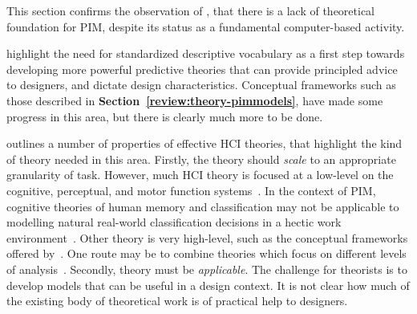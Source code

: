 This section confirms the observation of \citet{Whittaker-rta:00}, that there is a lack of theoretical foundation for PIM, despite its status as a fundamental computer-based activity.  %

\citet{Whittaker-rta:00} highlight the need for standardized descriptive vocabulary as a first step towards developing more powerful predictive theories that can provide principled advice to designers, and dictate design characteristics.  Conceptual frameworks such as those described in \textbf{Section~\ref{review:theory-pimmodels}}, have made some progress in this area, but there is clearly much more to be done.


\citet{rogers:04} outlines a number of properties of effective HCI theories, that highlight the kind of theory needed in this area.   Firstly, the theory should \textit{scale} to an appropriate granularity of task.  However, much HCI theory is focused at a low-level on the cognitive, perceptual, and motor function systems~\citep{newman:95}.  In the context of PIM, cognitive theories of human memory and classification may not be applicable to  modelling natural real-world classification decisions in a hectic work environment~\citep{ml:92}. Other theory is very high-level, such as the conceptual frameworks offered by~\citet{dk:01}.  One route may be to combine theories which focus on different levels of analysis~\citep{barnard:00}.   Secondly, theory must be \textit{applicable}.   The challenge for theorists is to develop models that can be useful in a design context.  It is not clear how much of the existing body of theoretical work is of practical help to designers.


